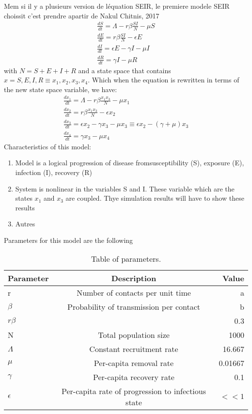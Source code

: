 \documentclass[a4paper, 12pt, notitlepage]{report}
\begin{document}
Mem si il y a plusieurs version de l\'equation SEIR, le premiere modele SEIR choissit  c'est prendre apartir de Nakul Chitnis, 2017\\
\begin{eqnarray}
\label{eqn:seirmdl}
\frac{dS}{dt}=\Lambda -r\beta \frac{SI}{N}-\mu S\\
\frac{dE}{dt}= r\beta \frac{SI}{N}-\epsilon E\\
\frac{dI}{dt}=\epsilon E-\gamma I -\mu I\\
\frac{dR}{dt}=\gamma I- \mu R
\end{eqnarray}
with $N=S+E+I+R$ and a state space that contains $x={S,E,I,R}\equiv{x_1,x_2,x_3,x_4}$. Which when the equation is rewritten in terms of the new state space variable, we have:
\begin{eqnarray}
\label{eqn:seirmdl}
\frac{dx_1}{dt}=\Lambda-r\beta \frac{x_1x_3}{N}-\mu x_1\\
\frac{dx_2}{dt}= r\beta \frac{x_1x_3}{N}-\epsilon x_2\\
\frac{dx_3}{dt}=\epsilon x_2-\gamma x_3 -\mu x_3 \equiv \epsilon x_2-(\gamma +\mu) x_3 \\
\frac{dx_4}{dt}=\gamma x_3- \mu x_4
\end{eqnarray}
Characteristics of this model:
\begin{enumerate}
\item
Model is a logical progression of disease from\textellipsis susceptibility (S), exposure (E), infection (I), recovery (R)
\item
System is nonlinear in the variables S and I. These variable which are the states $x_1$ and $x_3$ are coupled. Thye simulation results will have to show these results
\item
Autres
\end{enumerate}
Parameters for this model are the following
\begin{table}[h!]
  \begin{center}
    \caption{Table of parameters.}
    \label{tab:table1}
    \begin{tabular}{l|c|r} %
      \textbf{Parameter} & \textbf{Description} & \textbf{Value}\\
      \hline
      r & Number of contacts per unit time & a\\
      $\beta$ & Probability of transmission per contact & b\\
       $r\beta$ &  & 0.3\\
      N & Total population size & 1000\\
      $\Lambda$ & Constant recruitment rate & 16.667\\
      $\mu$ & Per-capita removal rate & 0.01667\\
      $\gamma$ & Per-capita recovery rate & 0.1\\ 
      $\epsilon$ & Per-capita rate of progression to infectious state & $<<1$ \\
    \end{tabular}
  \end{center}
\end{table}
\end{document}
